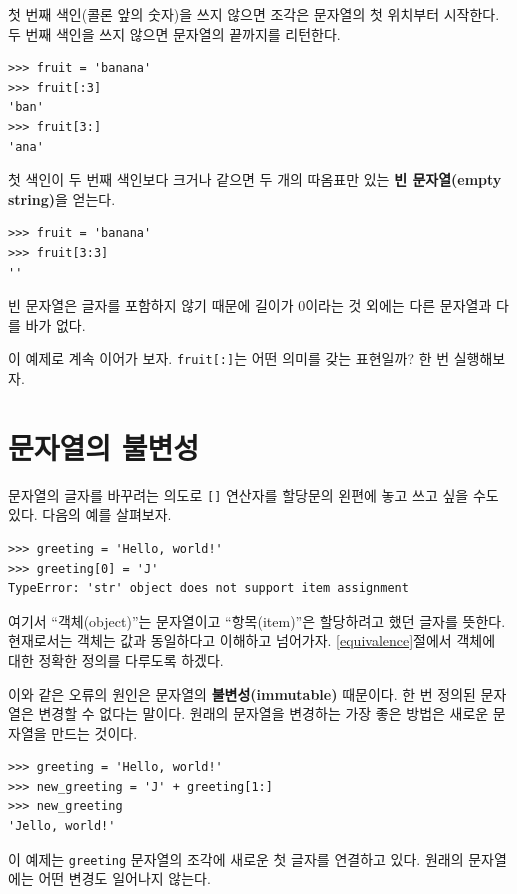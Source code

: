 \documentclass[10pt]{book}
\begin{document}
첫 번째 색인(콜론 앞의 숫자)을 쓰지 않으면 조각은 문자열의 첫 위치부터
시작한다.  두 번째 색인을 쓰지 않으면 문자열의 끝까지를 리턴한다.

\begin{verbatim}
>>> fruit = 'banana'
>>> fruit[:3]
'ban'
>>> fruit[3:]
'ana'
\end{verbatim}
%
첫 색인이 두 번째 색인보다 크거나 같으면 두 개의 따옴표만 있는 {\bf 빈
  문자열(empty string)}을 얻는다.

\begin{verbatim}
>>> fruit = 'banana'
>>> fruit[3:3]
''
\end{verbatim}
%
빈 문자열은 글자를 포함하지 않기 때문에 길이가 0이라는 것 외에는 다른
문자열과 다를 바가 없다.

이 예제로 계속 이어가 보자.  {\tt fruit[:]}는 어떤 의미를 갖는
표현일까?  한 번 실행해보자.



\section{문자열의 불변성}

문자열의 글자를 바꾸려는 의도로 {\tt[]} 연산자를 할당문의 왼편에 놓고
쓰고 싶을 수도 있다.  다음의 예를 살펴보자.

\begin{verbatim}
>>> greeting = 'Hello, world!'
>>> greeting[0] = 'J'
TypeError: 'str' object does not support item assignment
\end{verbatim}
%
여기서 ``객체(object)''는 문자열이고 ``항목(item)''은 할당하려고 했던
글자를 뜻한다.  현재로서는 객체는 값과 동일하다고 이해하고
넘어가자. \ref{equivalence}절에서 객체에 대한 정확한 정의를 다루도록
하겠다.

이와 같은 오류의 원인은 문자열의 {\bf 불변성(immutable)} 때문이다.  한
번 정의된 문자열은 변경할 수 없다는 말이다.  원래의 문자열을 변경하는
가장 좋은 방법은 새로운 문자열을 만드는 것이다.

\begin{verbatim}
>>> greeting = 'Hello, world!'
>>> new_greeting = 'J' + greeting[1:]
>>> new_greeting
'Jello, world!'
\end{verbatim}
%
이 예제는 {\tt greeting} 문자열의 조각에 새로운 첫 글자를 연결하고
있다.  원래의 문자열에는 어떤 변경도 일어나지 않는다.
\end{document}
